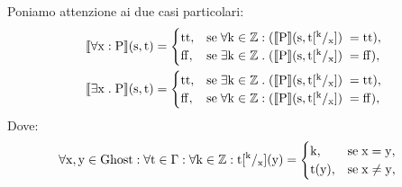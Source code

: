 \documentclass[a4paper, 12pt, oneside,fleqn]{book}
\begin{document}
Poniamo attenzione ai due casi particolari:
\begin{align}
\llbracket\forall\mathrm{x}\mathrel{:} \mathrm{P}\rrbracket(\mathrm{s},\mathrm{t}) &=
        \begin{cases}
                \mathrm{tt}, &\text{se}\hspace{1mm}\forall\mathrm{k}\in\mathbb{Z}\mathrel{:}(\llbracket \mathrm{P}\rrbracket(\mathrm{s},\mathrm{t}[^{\mathrm{k}}/_                                                                     {\mathrm{x}}])\hspace{1mm} = \mathrm{tt}),   \\
                \mathrm{ff}, &\text{se}\hspace{1mm}\exists\mathrm{k}\in\mathbb{Z}\mathrel{.}(\llbracket \mathrm{P}\rrbracket(\mathrm{s},\mathrm{t}[^{\mathrm{k}}/_                                                                      {\mathrm{x}}])\hspace{1mm} = \mathrm{ff}),
   \end{cases} \\
\llbracket \exists\mathrm{x} \mathrel{.} \mathrm{P}\rrbracket(\mathrm{s},\mathrm{t}) &=
        \begin{cases}
                \mathrm{tt},  &\text{se}\hspace{1mm} \exists\mathrm{k} \in \mathbb{Z}\mathrel{.}(\llbracket \mathrm{P}\rrbracket(\mathrm{s},\mathrm{t}[^{\mathrm{k}}/_                                                                  {\mathrm{x}}])\hspace{1mm} = \mathrm{tt}),   \\
                \mathrm{ff},&\text{se}\hspace{1mm}\forall\mathrm{k} \in \mathbb{Z}\mathrel{:}(\llbracket \mathrm{P}\rrbracket(\mathrm{s},\mathrm{t}[^{\mathrm{k}}/_{\mathrm{x}}])                                                              \hspace{1mm} = \mathrm{ff}),
        \end{cases}
\end{align}
Dove: \\
\begin{align}
\forall\mathrm{x} ,\mathrm{y}\in\mathrm{Ghost}\mathrel{:}\forall\mathrm{t} \in \Gamma \mathrel{:} \forall\mathrm{k} \in \mathbb{Z} \mathrel{:} \mathrm{t}[^{\mathrm{k}}/_{\mathrm{x}}](\mathrm{y}) &=
        \begin{cases}
                \mathrm{k},  &\text{se}\hspace{1mm} \mathrm{x}=\mathrm{y},   \\
            \mathrm{t}(\mathrm{y}),&\text{se}\hspace{1mm} \mathrm{x} \neq \mathrm{y},
        \end{cases}
\end{align}
\end{document}
